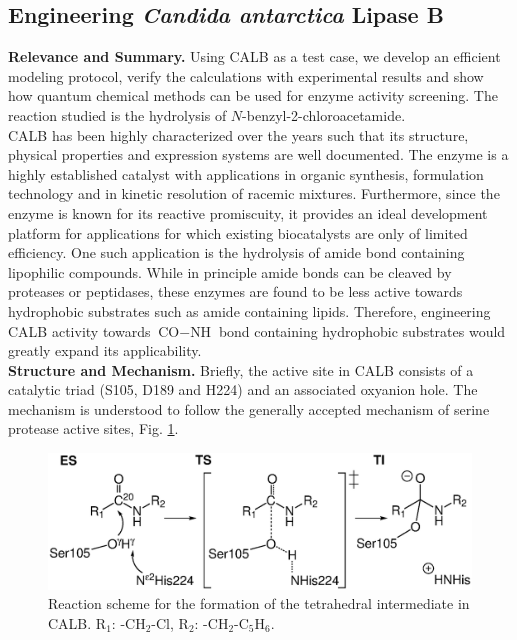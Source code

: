 \subsection{Engineering {\textit{Candida antarctica} Lipase B}}
\textbf{Relevance and Summary.}
Using CALB as a test case, we develop an efficient modeling protocol, verify the calculations with experimental results and show how quantum chemical methods can be used for enzyme activity screening\cite{10.1371/journal.pone.0049849, hediger2013silico}.
The reaction studied is the hydrolysis of $N$-benzyl-2-chloroacetamide.\\
CALB has been highly characterized over the years such that its structure, physical properties and expression systems are well documented\cite{uppenberg1994sequence, uppenberg1995crystallographic}.
The enzyme is a highly established catalyst with applications in organic synthesis, formulation technology\cite{gayot2003modification} and in kinetic resolution of racemic mixtures\cite{gotor2006candida, naik2010lipases, chaput2012contribution}.
Furthermore, since the enzyme is known for its reactive promiscuity\cite{bornscheuer2004catalytic, CBIC:CBIC200800318}, it provides an ideal development platform for applications for which existing biocatalysts are only of limited efficiency.
One such application is the hydrolysis of amide bond containing lipophilic compounds.
While in principle amide bonds can be cleaved by proteases or peptidases, these enzymes are found to be less active towards hydrophobic substrates such as amide containing lipids\cite{nakagawa2007engineering}.
Therefore, engineering CALB activity towards ${\text{CO}-\text{NH}}$ bond containing hydrophobic substrates would greatly expand its applicability.\\
\textbf{Structure and Mechanism.}
Briefly, the active site in CALB consists of a catalytic triad (S105, D189 and H224) and an associated oxyanion hole.
The mechanism is understood to follow the generally accepted mechanism of serine protease active sites\cite{hedstrom2002serine}, Fig. \ref{fig:calb-mechanism}.
\begin{figure}[htbp] 
\includegraphics[width=0.98\linewidth]{calb-mechanism.eps}
\caption{
Reaction scheme for the formation of the tetrahedral intermediate in CALB.
R$_1$: -CH$_2$-Cl, R$_2$: -CH$_2$-C$_5$H$_6$\cite{hediger2013silico}.
}
\label{fig:calb-mechanism}
\end{figure}
